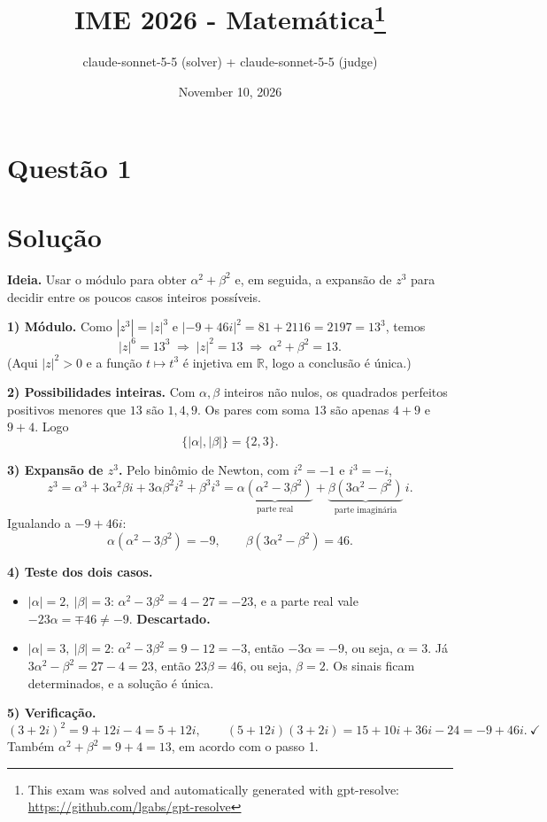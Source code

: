 \documentclass{article}%
\title{IME 2026 - Matemática\thanks{This exam was solved and automatically generated with gpt-resolve: \url{https://github.com/lgabs/gpt-resolve}}}%
\author{claude{-}sonnet{-}5{-}5 (solver) + claude{-}sonnet{-}5{-}5 (judge)}%
\date{November 10, 2026}%
\begin{document}
%
\normalsize%
\maketitle%
\section*{Questão 1}

\section*{Solução}

\textbf{Ideia.} Usar o módulo para obter $\alpha^2+\beta^2$ e, em seguida, a expansão de $z^3$ para decidir entre os poucos casos inteiros possíveis.

\medskip
\textbf{1) Módulo.} Como $|z^3|=|z|^3$ e $|-9+46i|^2=81+2116=2197=13^3$, temos
\[
|z|^6=13^3 \;\Longrightarrow\; |z|^2=13 \;\Longrightarrow\; \alpha^2+\beta^2=13 .
\]
(Aqui $|z|^2>0$ e a função $t\mapsto t^3$ é injetiva em $\mathbb{R}$, logo a conclusão é única.)

\medskip
\textbf{2) Possibilidades inteiras.} Com $\alpha,\beta$ inteiros não nulos, os quadrados perfeitos positivos menores que $13$ são $1,4,9$. Os pares com soma $13$ são apenas $4+9$ e $9+4$. Logo
\[
\{|\alpha|,|\beta|\}=\{2,3\}.
\]

\medskip
\textbf{3) Expansão de $z^3$.} Pelo binômio de Newton, com $i^2=-1$ e $i^3=-i$,
\[
z^3=\alpha^3+3\alpha^2\beta i+3\alpha\beta^2 i^2+\beta^3 i^3=\underbrace{\alpha\left(\alpha^2-3\beta^2\right)}_{\text{parte real}}+\underbrace{\beta\left(3\alpha^2-\beta^2\right)}_{\text{parte imaginária}}\,i .
\]
Igualando a $-9+46i$:
\[
\alpha\left(\alpha^2-3\beta^2\right)=-9, \qquad \beta\left(3\alpha^2-\beta^2\right)=46 .
\]

\medskip
\textbf{4) Teste dos dois casos.}

\begin{itemize}
\item $|\alpha|=2,\ |\beta|=3$: $\alpha^2-3\beta^2=4-27=-23$, e a parte real vale $-23\alpha=\mp 46\neq -9$. \textbf{Descartado.}
\item $|\alpha|=3,\ |\beta|=2$: $\alpha^2-3\beta^2=9-12=-3$, então $-3\alpha=-9$, ou seja, $\alpha=3$. Já $3\alpha^2-\beta^2=27-4=23$, então $23\beta=46$, ou seja, $\beta=2$. Os sinais ficam determinados, e a solução é única.
\end{itemize}

\medskip
\textbf{5) Verificação.}
\[
(3+2i)^2=9+12i-4=5+12i,\qquad (5+12i)(3+2i)=15+10i+36i-24=-9+46i .\ \checkmark
\]
Também $\alpha^2+\beta^2=9+4=13$, em acordo com o passo 1.
\end{document}
